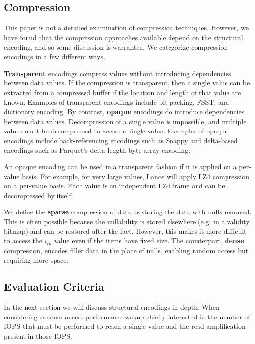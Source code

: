 \documentclass[sigconf, nonacm]{acmart}
\begin{document}
\subsection{Compression}

This paper is not a detailed examination of compression techniques.  However, we have found that the compression approaches available depend on the structural encoding, and so some discussion is warranted.  We categorize compression encodings in a few different ways.

\textbf{Transparent} encodings compress values without introducing dependencies between data values.  If the compression is transparent, then a single value can be extracted from a compressed buffer if the location and length of that value are known.  Examples of transparent encodings include bit packing, FSST, and dictionary encoding.  By contrast, \textbf{opaque} encodings do introduce dependencies between data values.  Decompression of a single value is impossible, and multiple values must be decompressed to access a single value.  Examples of opaque encodings include back-referencing encodings such as Snappy and delta-based encodings such as Parquet's delta-length byte array encoding.

An opaque encoding can be used in a transparent fashion if it is applied on a per-value basis.  For example, for very large values, Lance will apply LZ4 compression on a per-value basis.  Each value is an independent LZ4 frame and can be decompressed by itself.

We define the \textbf{sparse} compression of data as storing the data with nulls removed.  This is often possible because the nullability is stored elsewhere (e.g. in a validity bitmap) and can be restored after the fact.  However, this makes it more difficult to access the $i_{th}$ value even if the items have fixed size.  The counterpart, \textbf{dense} compression, encodes filler data in the place of nulls, enabling random access but requiring more space.

\subsection{Evaluation Criteria}

In the next section we will discuss structural encodings in depth.  When considering random access performance we are chiefly interested in the number of IOPS that must be performed to reach a single value and the read amplification present in those IOPS.
\end{document}
